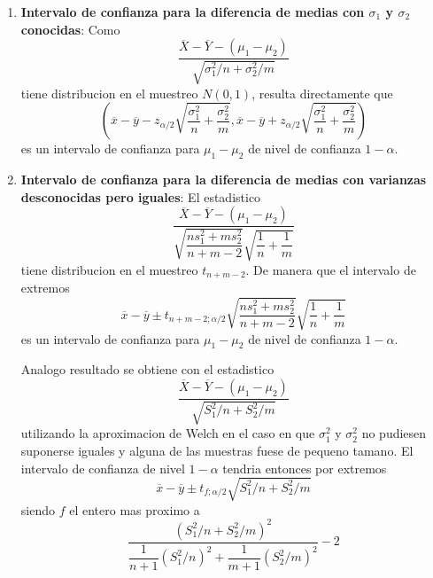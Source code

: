 \documentclass[10pt]{extarticle}
\newcommand{\<}{\langle}
\renewcommand{\>}{\rangle}
\theoremstyle{definition}
\begin{document}
\begin{enumerate}
  \item \textbf{Intervalo de confianza para la diferencia de medias con $\sigma_1$ y $\sigma_2$ conocidas}: Como
        \begin{equation*}
          \dfrac{\overline{X}-\overline{Y} - (\mu_1-\mu_2)}{\sqrt{\sigma_1^2/n + \sigma_2^2/m}}
        \end{equation*}
        tiene distribucion en el muestreo $N(0,1)$, resulta directamente que
        \begin{equation*}
          (\overline{x} - \overline{y} - z_{\alpha/2}\sqrt{\dfrac{\sigma_1^2}{n} + \dfrac{\sigma_2^2}{m}}, \overline{x} - \overline{y} + z_{\alpha/2}\sqrt{\dfrac{\sigma_1^2}{n} + \dfrac{\sigma_2^2}{m}})
        \end{equation*}
        es un intervalo de confianza para $\mu_1-\mu_2$ de nivel de confianza $1-\alpha$.

  \item \textbf{Intervalo de confianza para la diferencia de medias con varianzas desconocidas pero iguales}: El estadistico
        \begin{equation*}
          \dfrac{\overline{X}-\overline{Y} - (\mu_1-\mu_2)}{\sqrt{\dfrac{ns_1^2 + ms_2^2}{n+m-2}} \sqrt{\dfrac{1}{n} + \dfrac{1}{m}}}
        \end{equation*}
        tiene distribucion en el muestreo $t_{n+m-2}$. De manera que el intervalo de extremos
        \begin{equation*}
          \overline{x} - \overline{y} \pm t_{n+m-2;\alpha/2} \sqrt{\dfrac{ns_1^2 + ms_2^2}{n+m-2}}\sqrt{\dfrac{1}{n} + \dfrac{1}{m}}
        \end{equation*}
        es un intervalo de confianza para $\mu_1-\mu_2$ de nivel de confianza $1-\alpha$.

        Analogo resultado se obtiene con el estadistico
        \begin{equation*}
          \dfrac{\overline{X}-\overline{Y} - (\mu_1-\mu_2)}{\sqrt{S_1^2/n + S_2^2/m}}
        \end{equation*}
        utilizando la aproximacion de Welch en el caso en que $\sigma_1^2$ y $\sigma_2^2$ no pudiesen suponerse iguales y alguna de las muestras fuese de pequeno tamano. El intervalo de confianza de nivel $1-\alpha$ tendria entonces por extremos
        \begin{equation*}
          \overline{x}-\overline{y} \pm t_{f;\alpha/2} \sqrt{S_1^2/n + S^2_2/m}
        \end{equation*}
        siendo $f$ el entero mas proximo a
        \begin{equation*}
          \dfrac{(S_1^2/n + S_2^2/m)^2}{\dfrac{1}{n+1} (S_1^2/n)^2 + \dfrac{1}{m+1}(S_2^2/m)^2} - 2
        \end{equation*}


\end{enumerate}
\end{document}
